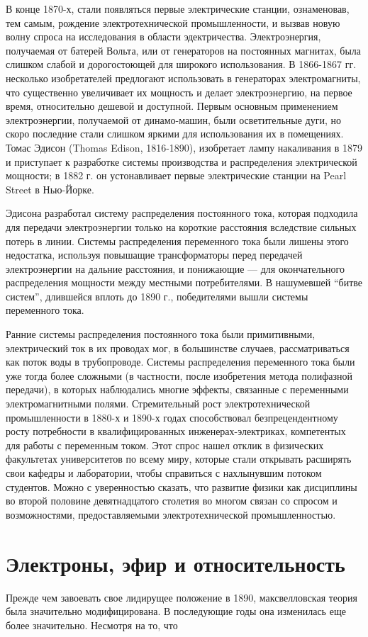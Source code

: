 \documentclass[12pt, oneside, a4paper]{article}
\begin{document}
В конце 1870-х, стали появляться первые электрические станции, ознаменовав, тем самым, рождение электротехнической промышленности, и вызвав новую волну спроса на исследования в области эдектричества. Электроэнергия, получаемая от батерей Вольта, или от генераторов на постоянных магнитах, была слишком слабой и дорогостоющей для широкого использования. В 1866-1867 гг. несколько изобретателей предлогают использовать в генераторах электромагниты, что существенно увеличивает их мощность и делает электроэнергию, на первое время, относительно дешевой и доступной. Первым основным применением электроэнергии, получаемой от динамо-машин, были осветительные дуги, но скоро последние стали слишком яркими для использования их в помещениях. Томас Эдисон (Thomas Edison, 1816-1890), изобретает лампу накаливания в 1879 и приступает к разработке системы производства и распределения электрической мощности; в 1882 г. он устонавливает первые электрические станции на Pearl Street в Нью-Йорке.

Эдисона разработал систему распределения постоянного тока, которая подходила для передачи электроэнергии только на короткие расстояния вследствие сильных потерь в линии. Системы распределения переменного тока были лишены этого недостатка, используя повышащие трансформаторы перед передачей электроэнергии на дальние расстояния, и понижающие --- для окончательного распределения мощности между местными потребителями. В нашумевшей ``битве систем'', длившейся вплоть до 1890 г., победителями вышли системы переменного тока.

Ранние системы распределения постоянного тока были примитивными, электрический ток в их проводах мог, в большинстве случаев, рассматриваться как поток воды в трубопроводе. Системы распределения переменного тока были уже тогда более сложными (в частности, после изобретения метода полифазной передачи), в которых наблюдались многие эффекты, связанные с переменными электромагнитными полями. Стремительный рост электротехнической промышленности в 1880-х и 1890-х годах способствовал безпрецендентному росту потребности в квалифицированных инженерах-электриках, компетентых для работы с переменным током. Этот спрос нашел отклик в физических факультетах университетов по всему миру, которые стали открывать расширять свои кафедры и лаборатории, чтобы справиться с нахлынувшим потоком студентов. Можно с уверенностью сказать, что развитие физики как дисциплины во второй половине девятнадцатого столетия во многом связан со спросом и возможностями, предоставляемыми электротехнической промышленностью. 

\section*{Электроны, эфир и относительность}
Прежде чем завоевать свое лидирущее положение в 1890, максвелловская теория была значительно модифицирована. В последующие годы она изменилась еще более значительно. Несмотря на то, что 
\end{document}
